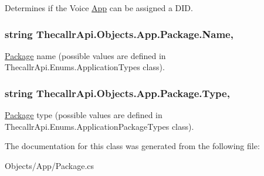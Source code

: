 Determines if the Voice \hyperlink{class_thecallr_api_1_1_objects_1_1_app_1_1_app}{App} can be assigned a D\+I\+D. 

\hypertarget{class_thecallr_api_1_1_objects_1_1_app_1_1_package_a4366fa87c76002ac7d586a021313f8f6}{
\subsubsection[{Name}]{\setlength{\rightskip}{0pt plus 5cm}string Thecallr\+Api.\+Objects.\+App.\+Package.\+Name\hspace{0.3cm}{\ttfamily [get]}, {\ttfamily [set]}}}\label{class_thecallr_api_1_1_objects_1_1_app_1_1_package_a4366fa87c76002ac7d586a021313f8f6}


\hyperlink{class_thecallr_api_1_1_objects_1_1_app_1_1_package}{Package} name (possible values are defined in Thecallr\+Api.\+Enums.\+Application\+Types class). 

\hypertarget{class_thecallr_api_1_1_objects_1_1_app_1_1_package_a63a019eaced5637657eb6482738e4537}{
\subsubsection[{Type}]{\setlength{\rightskip}{0pt plus 5cm}string Thecallr\+Api.\+Objects.\+App.\+Package.\+Type\hspace{0.3cm}{\ttfamily [get]}, {\ttfamily [set]}}}\label{class_thecallr_api_1_1_objects_1_1_app_1_1_package_a63a019eaced5637657eb6482738e4537}


\hyperlink{class_thecallr_api_1_1_objects_1_1_app_1_1_package}{Package} type (possible values are defined in Thecallr\+Api.\+Enums.\+Application\+Package\+Types class). 



The documentation for this class was generated from the following file\+:\begin{DoxyCompactItemize}
\item 
Objects/\+App/Package.\+cs\end{DoxyCompactItemize}
